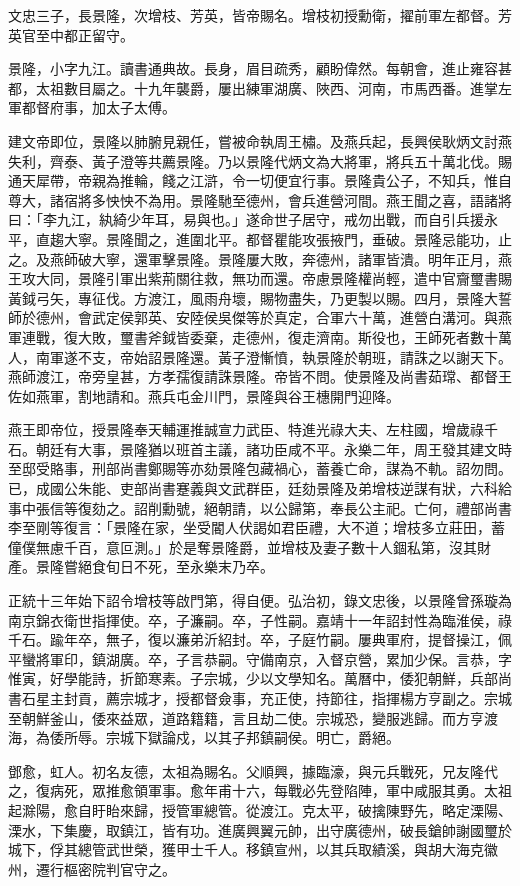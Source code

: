 \begin{pinyinscope}
文忠三子，長景隆，次增枝、芳英，皆帝賜名。增枝初授勳衛，擢前軍左都督。芳英官至中都正留守。

景隆，小字九江。讀書通典故。長身，眉目疏秀，顧盼偉然。每朝會，進止雍容甚都，太祖數目屬之。十九年襲爵，屢出練軍湖廣、陜西、河南，市馬西番。進掌左軍都督府事，加太子太傅。

建文帝即位，景隆以肺腑見親任，嘗被命執周王橚。及燕兵起，長興侯耿炳文討燕失利，齊泰、黃子澄等共薦景隆。乃以景隆代炳文為大將軍，將兵五十萬北伐。賜通天犀帶，帝親為推輪，餞之江滸，令一切便宜行事。景隆貴公子，不知兵，惟自尊大，諸宿將多怏怏不為用。景隆馳至德州，會兵進營河間。燕王聞之喜，語諸將曰：「李九江，紈綺少年耳，易與也。」遂命世子居守，戒勿出戰，而自引兵援永平，直趨大寧。景隆聞之，進圍北平。都督瞿能攻張掖門，垂破。景隆忌能功，止之。及燕師破大寧，還軍擊景隆。景隆屢大敗，奔德州，諸軍皆潰。明年正月，燕王攻大同，景隆引軍出紫荊關往救，無功而還。帝慮景隆權尚輕，遣中官齎璽書賜黃鉞弓矢，專征伐。方渡江，風雨舟壞，賜物盡失，乃更製以賜。四月，景隆大誓師於德州，會武定侯郭英、安陸侯吳傑等於真定，合軍六十萬，進營白溝河。與燕軍連戰，復大敗，璽書斧鉞皆委棄，走德州，復走濟南。斯役也，王師死者數十萬人，南軍遂不支，帝始詔景隆還。黃子澄慚憤，執景隆於朝班，請誅之以謝天下。燕師渡江，帝旁皇甚，方孝孺復請誅景隆。帝皆不問。使景隆及尚書茹瑺、都督王佐如燕軍，割地請和。燕兵屯金川門，景隆與谷王橞開門迎降。

燕王即帝位，授景隆奉天輔運推誠宣力武臣、特進光祿大夫、左柱國，增歲祿千石。朝廷有大事，景隆猶以班首主議，諸功臣咸不平。永樂二年，周王發其建文時至邸受賂事，刑部尚書鄭賜等亦劾景隆包藏禍心，蓄養亡命，謀為不軌。詔勿問。已，成國公朱能、吏部尚書蹇義與文武群臣，廷劾景隆及弟增枝逆謀有狀，六科給事中張信等復劾之。詔削勳號，絕朝請，以公歸第，奉長公主祀。亡何，禮部尚書李至剛等復言：「景隆在家，坐受閽人伏謁如君臣禮，大不道；增枝多立莊田，蓄僮僕無慮千百，意叵測。」於是奪景隆爵，並增枝及妻子數十人錮私第，沒其財產。景隆嘗絕食旬日不死，至永樂末乃卒。

正統十三年始下詔令增枝等啟門第，得自便。弘治初，錄文忠後，以景隆曾孫璇為南京錦衣衛世指揮使。卒，子濂嗣。卒，子性嗣。嘉靖十一年詔封性為臨淮侯，祿千石。踰年卒，無子，復以濂弟沂紹封。卒，子庭竹嗣。屢典軍府，提督操江，佩平蠻將軍印，鎮湖廣。卒，子言恭嗣。守備南京，入督京營，累加少保。言恭，字惟寅，好學能詩，折節寒素。子宗城，少以文學知名。萬曆中，倭犯朝鮮，兵部尚書石星主封貢，薦宗城才，授都督僉事，充正使，持節往，指揮楊方亨副之。宗城至朝鮮釜山，倭來益眾，道路籍籍，言且劫二使。宗城恐，變服逃歸。而方亨渡海，為倭所辱。宗城下獄論戍，以其子邦鎮嗣侯。明亡，爵絕。

鄧愈，虹人。初名友德，太祖為賜名。父順興，據臨濠，與元兵戰死，兄友隆代之，復病死，眾推愈領軍事。愈年甫十六，每戰必先登陷陣，軍中咸服其勇。太祖起滁陽，愈自盱眙來歸，授管軍總管。從渡江。克太平，破擒陳野先，略定溧陽、溧水，下集慶，取鎮江，皆有功。進廣興翼元帥，出守廣德州，破長鎗帥謝國璽於城下，俘其總管武世榮，獲甲士千人。移鎮宣州，以其兵取績溪，與胡大海克徽州，遷行樞密院判官守之。


\end{pinyinscope}
